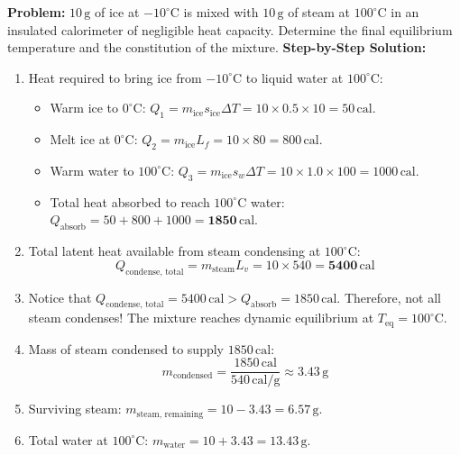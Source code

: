 \documentclass[10pt,twoside,openright]{book}
\begin{document}
\begin{usecasebox}
\textbf{Problem:} $10\,\mathrm{g}$ of ice at $-10^\circ\mathrm{C}$ is mixed with $10\,\mathrm{g}$ of steam at $100^\circ\mathrm{C}$ in an insulated calorimeter of negligible heat capacity. Determine the final equilibrium temperature and the constitution of the mixture.
\textbf{Step-by-Step Solution:}
\begin{enumerate}
  \item Heat required to bring ice from $-10^\circ\mathrm{C}$ to liquid water at $100^\circ\mathrm{C}$:
  \begin{itemize}
    \item Warm ice to $0^\circ\mathrm{C}$: $Q_1 = m_{\text{ice}} s_{\text{ice}} \Delta T = 10 \times 0.5 \times 10 = 50\,\mathrm{cal}$.
    \item Melt ice at $0^\circ\mathrm{C}$: $Q_2 = m_{\text{ice}} L_f = 10 \times 80 = 800\,\mathrm{cal}$.
    \item Warm water to $100^\circ\mathrm{C}$: $Q_3 = m_{\text{ice}} s_w \Delta T = 10 \times 1.0 \times 100 = 1000\,\mathrm{cal}$.
    \item Total heat absorbed to reach $100^\circ\mathrm{C}$ water: $Q_{\text{absorb}} = 50 + 800 + 1000 = \mathbf{1850\,\mathrm{cal}}$.
  \end{itemize}
  \item Total latent heat available from steam condensing at $100^\circ\mathrm{C}$:
  \begin{equation}
    Q_{\text{condense, total}} = m_{\text{steam}} L_v = 10 \times 540 = \mathbf{5400\,\mathrm{cal}}
  \end{equation}
  \item Notice that $Q_{\text{condense, total}} = 5400\,\mathrm{cal} > Q_{\text{absorb}} = 1850\,\mathrm{cal}$.
  Therefore, not all steam condenses! The mixture reaches dynamic equilibrium at \textbf{$T_{\text{eq}} = 100^\circ\mathrm{C}$}.
  \item Mass of steam condensed to supply $1850\,\mathrm{cal}$:
  \begin{equation}
    m_{\text{condensed}} = \frac{1850\,\mathrm{cal}}{540\,\mathrm{cal/g}} \approx 3.43\,\mathrm{g}
  \end{equation}
  \item Surviving steam: $m_{\text{steam, remaining}} = 10 - 3.43 = \mathbf{6.57\,\mathrm{g}}$.
  \item Total water at $100^\circ\mathrm{C}$: $m_{\text{water}} = 10 + 3.43 = \mathbf{13.43\,\mathrm{g}}$.
\end{enumerate}
\end{usecasebox}
\end{document}
